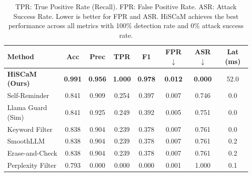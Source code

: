 
\begin{table}[h]
\centering
\caption{Comparison with Baseline Defense Methods}
\label{tab:baseline_comparison}
\begin{tabular}{lccccccc}
\toprule
\textbf{Method} & \textbf{Acc} & \textbf{Prec} & \textbf{TPR} & \textbf{F1} & \textbf{FPR} $\downarrow$ & \textbf{ASR} $\downarrow$ & \textbf{Lat (ms)} \\
\midrule
\textbf{HiSCaM (Ours)} & \textbf{0.991} & \textbf{0.956} & \textbf{1.000} & \textbf{0.978} & \textbf{0.012} & \textbf{0.000} & 52.0 \\
Self-Reminder & 0.841 & 0.909 & 0.254 & 0.397 & 0.007 & 0.746 & 0.0 \\
Llama Guard (Sim) & 0.841 & 0.925 & 0.249 & 0.392 & 0.005 & 0.751 & 0.0 \\
Keyword Filter & 0.838 & 0.904 & 0.239 & 0.378 & 0.007 & 0.761 & 0.0 \\
SmoothLLM & 0.838 & 0.904 & 0.239 & 0.378 & 0.007 & 0.761 & 0.2 \\
Erase-and-Check & 0.838 & 0.904 & 0.239 & 0.378 & 0.007 & 0.761 & 0.2 \\
Perplexity Filter & 0.793 & 0.000 & 0.000 & 0.000 & 0.001 & 1.000 & 0.1 \\

\bottomrule
\end{tabular}
\vspace{2mm}
\caption*{TPR: True Positive Rate (Recall). FPR: False Positive Rate. ASR: Attack Success Rate. Lower is better for FPR and ASR. HiSCaM achieves the best performance across all metrics with 100\% detection rate and 0\% attack success rate.}
\end{table}
